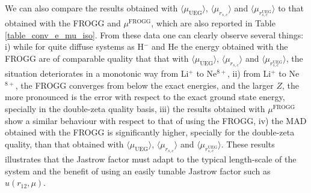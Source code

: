 \documentclass[aip,jcp,reprint,noshowkeys,superscriptaddress]{revtex4-1}
\newcommand{\mfrogg}[0]{\mu^\text{FROGG}}
\newcommand{\muuegav}{\langle \mu_{\text{UEG}}\rangle}
\newcommand{\murscav}{\langle \mu_{r_{s,c}}\rangle}
\newcommand{\mursclda}{\langle \mu_{r_{s,c}^{\text{UEG}}}\rangle}
\begin{document}
We can also compare the results obtained with $\muuegav$, $\murscav$ and $\mursclda$ to that obtained with the FROGG and $\mfrogg$, which are also reported in Table \ref{table_conv_e_mu_iso}. 
From these data one can clearly observe several things: i) while for quite diffuse systems as H$^-$ and He the energy obtained with the FROGG are of comparable quality that that with $\muuegav$, $\murscav$ and $\mursclda$, the situation deteriorates in a monotonic way from Li$^+$ to Ne$^{8+}$, ii) from Li$^+$ to Ne$^{8+}$, the FROGG converges from below the exact energies, and the larger $Z$, the more pronounced is the error with respect to the exact ground state energy, specially in the double-zeta quality basis, iii) the results obtained with $\mfrogg$ show a similar behaviour with respect to that of using the FROGG, iv) the MAD obtained with the FROGG is significantly higher, specially for the double-zeta quality, than that obtained with $\muuegav$, $\murscav$ and $\mursclda$. 
These results illustrates that the Jastrow factor must adapt to the typical length-scale of the system and the benefit of using an easily tunable Jastrow factor such as $u(r_{12},\mu)$. 
\end{document}
